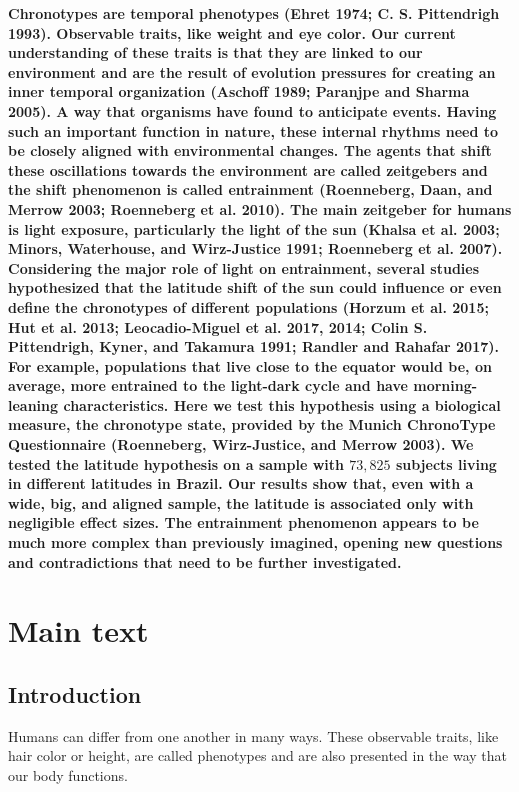 \documentclass[
  12pt,
  a4paper,
  oneside]{tesesusp}
\begin{document}
\noindent \textbf{Chronotypes are temporal phenotypes (Ehret 1974; C. S.
Pittendrigh 1993). Observable traits, like weight and eye color. Our
current understanding of these traits is that they are linked to our
environment and are the result of evolution pressures for creating an
inner temporal organization (Aschoff 1989; Paranjpe and Sharma 2005). A
way that organisms have found to anticipate events. Having such an
important function in nature, these internal rhythms need to be closely
aligned with environmental changes. The agents that shift these
oscillations towards the environment are called zeitgebers and the shift
phenomenon is called entrainment (Roenneberg, Daan, and Merrow 2003;
Roenneberg et al. 2010). The main zeitgeber for humans is light
exposure, particularly the light of the sun (Khalsa et al. 2003; Minors,
Waterhouse, and Wirz-Justice 1991; Roenneberg et al. 2007). Considering
the major role of light on entrainment, several studies hypothesized
that the latitude shift of the sun could influence or even define the
chronotypes of different populations (Horzum et al. 2015; Hut et al.
2013; Leocadio-Miguel et al. 2017, 2014; Colin S. Pittendrigh, Kyner,
and Takamura 1991; Randler and Rahafar 2017). For example, populations
that live close to the equator would be, on average, more entrained to
the light-dark cycle and have morning-leaning characteristics. Here we
test this hypothesis using a biological measure, the chronotype state,
provided by the Munich ChronoType Questionnaire (Roenneberg,
Wirz-Justice, and Merrow 2003). We tested the latitude hypothesis on a
sample with \(73,825\) subjects living in different latitudes in Brazil.
Our results show that, even with a wide, big, and aligned sample, the
latitude is associated only with negligible effect sizes. The
entrainment phenomenon appears to be much more complex than previously
imagined, opening new questions and contradictions that need to be
further investigated.}

\hypertarget{main-text}{%
\section{Main text}\label{main-text}}

\hypertarget{introduction-1}{%
\subsection{Introduction}\label{introduction-1}}

Humans can differ from one another in many ways. These observable
traits, like hair color or height, are called phenotypes and are also
presented in the way that our body functions.
\end{document}

